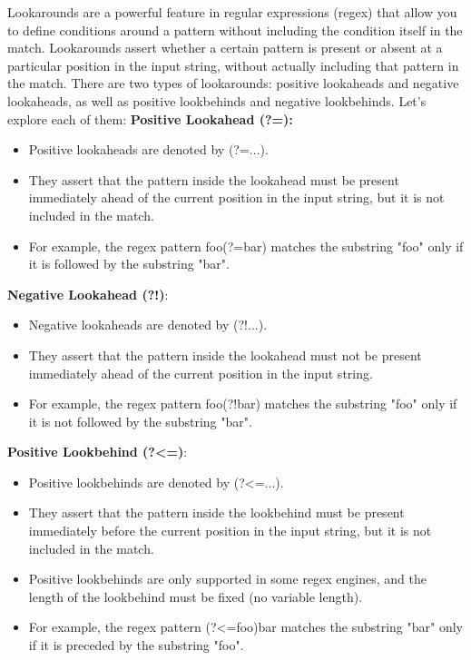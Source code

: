 \documentclass{report}
\begin{document}
    \pagebreak
    \bigbreak
    \noindent

    \bigbreak \noindent 
    Lookarounds are a powerful feature in regular expressions (regex) that allow you to define conditions around a pattern without including the condition itself in the match. Lookarounds assert whether a certain pattern is present or absent at a particular position in the input string, without actually including that pattern in the match. There are two types of lookarounds: positive lookaheads and negative lookaheads, as well as positive lookbehinds and negative lookbehinds. Let's explore each of them:
    \bigbreak \noindent 
    \textbf{Positive Lookahead (?=):}
    \begin{itemize}
        \item Positive lookaheads are denoted by (?=...).
        \item They assert that the pattern inside the lookahead must be present immediately ahead of the current position in the input string, but it is not included in the match.
        \item For example, the regex pattern foo(?=bar) matches the substring "foo" only if it is followed by the substring "bar".
    \end{itemize}
    \bigbreak \noindent 
    \textbf{Negative Lookahead (?!)}:

    \begin{itemize}
        \item Negative lookaheads are denoted by (?!...).
        \item They assert that the pattern inside the lookahead must not be present immediately ahead of the current position in the input string.
        \item For example, the regex pattern foo(?!bar) matches the substring "foo" only if it is not followed by the substring "bar".
    \end{itemize}

    \bigbreak \noindent     
    \textbf{Positive Lookbehind (?<=)}:
    \begin{itemize}
        \item Positive lookbehinds are denoted by (?<=...).
        \item They assert that the pattern inside the lookbehind must be present immediately before the current position in the input string, but it is not included in the match.
        \item Positive lookbehinds are only supported in some regex engines, and the length of the lookbehind must be fixed (no variable length).
        \item For example, the regex pattern (?<=foo)bar matches the substring "bar" only if it is preceded by the substring "foo".
    \end{itemize}
\end{document}
